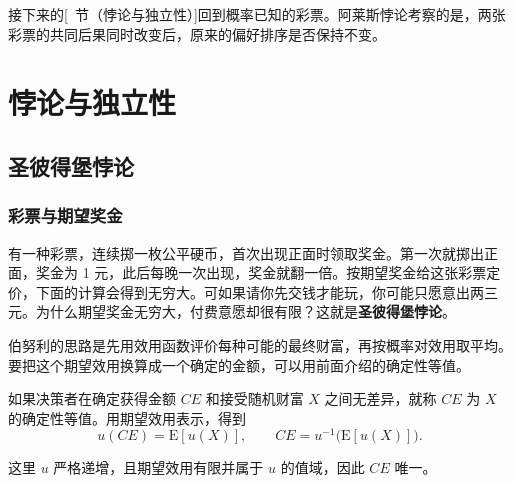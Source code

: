接下来的[~节（悖论与独立性）]回到概率已知的彩票。阿莱斯悖论考察的是，两张彩票的共同后果同时改变后，原来的偏好排序是否保持不变。

\section{悖论与独立性}\label{sec:wj-six-paradoxes}
\subsection{圣彼得堡悖论}
\subsubsection{彩票与期望奖金}
有一种彩票，连续掷一枚公平硬币，首次出现正面时领取奖金。第一次就掷出正面，奖金为 1 元，此后每晚一次出现，奖金就翻一倍。按期望奖金给这张彩票定价，下面的计算会得到无穷大。可如果请你先交钱才能玩，你可能只愿意出两三元。为什么期望奖金无穷大，付费意愿却很有限？这就是\textbf{圣彼得堡悖论}。

伯努利的思路是先用效用函数评价每种可能的最终财富，再按概率对效用取平均。要把这个期望效用换算成一个确定的金额，可以用前面介绍的确定性等值。

\begin{tcolorbox}[knowledge,title=确定性等值]
如果决策者在确定获得金额 $CE$ 和接受随机财富 $X$ 之间无差异，就称 $CE$ 为 $X$ 的确定性等值。用期望效用表示，得到
\[
 u(CE)=\mathrm E[u(X)],\qquad CE=u^{-1}\!\bigl(\mathrm E[u(X)]\bigr).
\]

这里 $u$ 严格递增，且期望效用有限并属于 $u$ 的值域，因此 $CE$ 唯一。
\end{tcolorbox}

